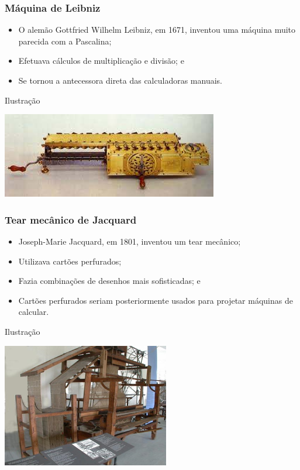 \documentclass[aspectratio=169]{beamer} %
\begin{document}
\begin{frame}
	\frametitle{Máquina de Leibniz}
	
	\begin{itemize}
		\item O alemão Gottfried Wilhelm Leibniz, em 1671, inventou uma máquina muito parecida com a Pascalina;
		\item Efetuava cálculos de multiplicação e divisão; e
		\item Se tornou a antecessora direta das calculadoras manuais.
	\end{itemize}\vfill
	
	\begin{exampleblock}{Ilustra\c cão}
		\begin{center}
			\includegraphics[scale=0.5]{img/maquina_leibniz}
		\end{center}
	\end{exampleblock}
\end{frame}

\begin{frame}
	\frametitle{Tear mecânico de Jacquard}
	
	\begin{itemize}
		\item Joseph-Marie Jacquard, em 1801, inventou um tear mecânico;
		\item Utilizava cartões perfurados;
		\item Fazia combinações de desenhos mais sofisticadas; e
		\item Cartões perfurados seriam posteriormente usados para projetar máquinas de calcular.
	\end{itemize}\vfill
	
	\begin{exampleblock}{Ilustra\c cão}
		\begin{center}
			\includegraphics[scale=0.5]{img/tear_jacquard}
		\end{center}
	\end{exampleblock}
\end{frame}
\end{document}
